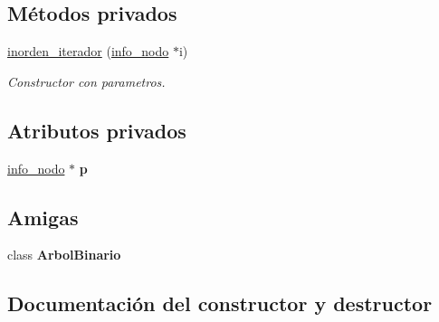 \subsection*{Métodos privados}
\begin{DoxyCompactItemize}
\item 
\hyperlink{classArbolBinario_1_1inorden__iterador_abeff96499253dfb2d19b0cbaba8ac6d8}{inorden\+\_\+iterador} (\hyperlink{structArbolBinario_1_1info__nodo}{info\+\_\+nodo} $\ast$i)
\begin{DoxyCompactList}\small\item\em Constructor con parametros. \end{DoxyCompactList}\end{DoxyCompactItemize}
\subsection*{Atributos privados}
\begin{DoxyCompactItemize}
\item 
\mbox{\label{classArbolBinario_1_1inorden__iterador_ad7c8f3804b30c426ff772712f6d3db63}} 
\hyperlink{structArbolBinario_1_1info__nodo}{info\+\_\+nodo} $\ast$ {\bfseries p}
\end{DoxyCompactItemize}
\subsection*{Amigas}
\begin{DoxyCompactItemize}
\item 
\mbox{\label{classArbolBinario_1_1inorden__iterador_a7aaf1bc41122321eaeb4dcc50d489fe8}} 
class {\bfseries Arbol\+Binario}
\end{DoxyCompactItemize}


\subsection{Documentación del constructor y destructor}
\mbox{\label{classArbolBinario_1_1inorden__iterador_abeff96499253dfb2d19b0cbaba8ac6d8}} 
